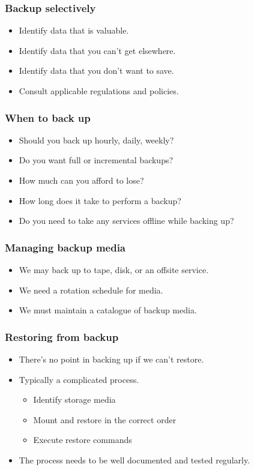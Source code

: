 \documentclass[10pt]{beamer}
\begin{document}
\begin{frame}
  \frametitle{Backup selectively}
 

\begin{itemize}
\item Identify data that is valuable.
\item Identify data that you can't get elsewhere.
\item Identify data that you don't want to save.
\item Consult applicable regulations and policies.
\end{itemize}
\end{frame}

\begin{frame}
  \frametitle{When to back up}
 

\begin{itemize}
\item  Should you back up hourly, daily, weekly?
\item  Do you want full or incremental backups?
\item  How much can you afford to lose?
\item  How long does it take to perform a backup?
\item  Do you need to take any services offline while backing up? 
\end{itemize}
\end{frame}


\begin{frame}
  \frametitle{Managing backup media}
 

\begin{itemize}
\item We may back up to tape, disk, or an offsite service. 
\item We need a rotation schedule for media.
\item We must maintain a catalogue of backup media.
\end{itemize}
\end{frame}


\begin{frame}
  \frametitle{Restoring from backup}
 

\begin{itemize}
\item There's no point in backing up if we can't restore.
\item Typically a complicated process.
      \begin{itemize}
        \item Identify storage media
	\item Mount and restore in the correct order
	\item Execute restore commands
      \end{itemize}
\item The process needs to be well documented and tested regularly.
\end{itemize}
\end{frame}
\end{document}
